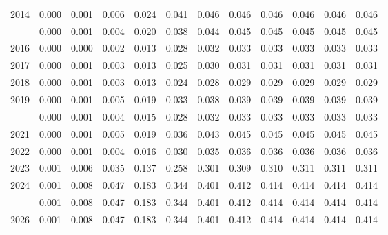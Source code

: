 \documentclass[
]{article}
\begin{document}
\begin{longtable}[t]{lrrrrrrrrrrr}
2014 & 0.000 & 0.001 & 0.006 & 0.024 & 0.041 & 0.046 & 0.046 & 0.046 & 0.046 & 0.046 & 0.046\\
\addlinespace
2015 & 0.000 & 0.001 & 0.004 & 0.020 & 0.038 & 0.044 & 0.045 & 0.045 & 0.045 & 0.045 & 0.045\\
2016 & 0.000 & 0.000 & 0.002 & 0.013 & 0.028 & 0.032 & 0.033 & 0.033 & 0.033 & 0.033 & 0.033\\
2017 & 0.000 & 0.001 & 0.003 & 0.013 & 0.025 & 0.030 & 0.031 & 0.031 & 0.031 & 0.031 & 0.031\\
2018 & 0.000 & 0.001 & 0.003 & 0.013 & 0.024 & 0.028 & 0.029 & 0.029 & 0.029 & 0.029 & 0.029\\
2019 & 0.000 & 0.001 & 0.005 & 0.019 & 0.033 & 0.038 & 0.039 & 0.039 & 0.039 & 0.039 & 0.039\\
\addlinespace
2020 & 0.000 & 0.001 & 0.004 & 0.015 & 0.028 & 0.032 & 0.033 & 0.033 & 0.033 & 0.033 & 0.033\\
2021 & 0.000 & 0.001 & 0.005 & 0.019 & 0.036 & 0.043 & 0.045 & 0.045 & 0.045 & 0.045 & 0.045\\
2022 & 0.000 & 0.001 & 0.004 & 0.016 & 0.030 & 0.035 & 0.036 & 0.036 & 0.036 & 0.036 & 0.036\\
2023 & 0.001 & 0.006 & 0.035 & 0.137 & 0.258 & 0.301 & 0.309 & 0.310 & 0.311 & 0.311 & 0.311\\
2024 & 0.001 & 0.008 & 0.047 & 0.183 & 0.344 & 0.401 & 0.412 & 0.414 & 0.414 & 0.414 & 0.414\\
\addlinespace
2025 & 0.001 & 0.008 & 0.047 & 0.183 & 0.344 & 0.401 & 0.412 & 0.414 & 0.414 & 0.414 & 0.414\\
2026 & 0.001 & 0.008 & 0.047 & 0.183 & 0.344 & 0.401 & 0.412 & 0.414 & 0.414 & 0.414 & 0.414\\*
\end{longtable}
\end{document}
